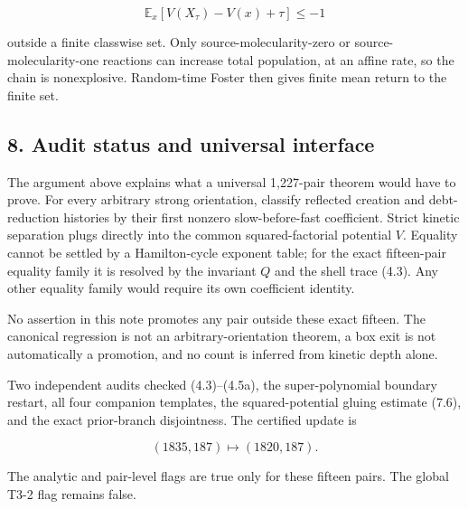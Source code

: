 \[
 \mathbb E_x[V(X_\tau)-V(x)+\tau]\leq-1              \tag{7.7}
\]

outside a finite classwise set. Only source-molecularity-zero or
source-molecularity-one reactions can increase total population, at an
affine rate, so the chain is nonexplosive. Random-time Foster then gives
finite mean return to the finite set.

\subsection{8. Audit status and universal
interface}

The argument above explains what a universal 1,227-pair theorem would
have to prove. For every arbitrary strong orientation, classify
reflected creation and debt-reduction histories by their first nonzero
slow-before-fast coefficient. Strict kinetic separation plugs directly
into the common squared-factorial potential \(V\). Equality cannot be
settled by a Hamilton-cycle exponent table; for the exact fifteen-pair
equality family it is resolved by the invariant \(Q\) and the shell
trace (4.3). Any other equality family would require its own coefficient
identity.

No assertion in this note promotes any pair outside these exact fifteen.
The canonical regression is not an arbitrary-orientation theorem, a box
exit is not automatically a promotion, and no count is inferred from
kinetic depth alone.

Two independent audits checked (4.3)--(4.5a), the super-polynomial
boundary restart, all four companion templates, the squared-potential
gluing estimate (7.6), and the exact prior-branch disjointness. The
certified update is

\[
 (1835,187)\longmapsto(1820,187).
\]

The analytic and pair-level flags are true only for these fifteen pairs.
The global T3-2 flag remains false.
